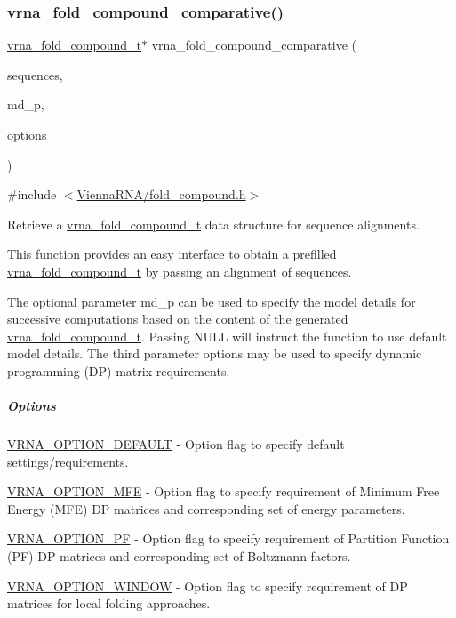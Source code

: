 \subsubsection{\texorpdfstring{vrna\+\_\+fold\+\_\+compound\+\_\+comparative()}{vrna\_fold\_compound\_comparative()}}
{\footnotesize\ttfamily \hyperlink{group__fold__compound_ga1b0cef17fd40466cef5968eaeeff6166}{vrna\+\_\+fold\+\_\+compound\+\_\+t}$\ast$ vrna\+\_\+fold\+\_\+compound\+\_\+comparative (\begin{DoxyParamCaption}\item[{const char $\ast$$\ast$}]{sequences,  }\item[{\hyperlink{group__model__details_ga1f8a10e12a0a1915f2a4eff0b28ea17c}{vrna\+\_\+md\+\_\+t} $\ast$}]{md\+\_\+p,  }\item[{unsigned int}]{options }\end{DoxyParamCaption})}



{\ttfamily \#include $<$\hyperlink{fold__compound_8h}{Vienna\+R\+N\+A/fold\+\_\+compound.\+h}$>$}



Retrieve a \hyperlink{group__fold__compound_ga1b0cef17fd40466cef5968eaeeff6166}{vrna\+\_\+fold\+\_\+compound\+\_\+t} data structure for sequence alignments. 

This function provides an easy interface to obtain a prefilled \hyperlink{group__fold__compound_ga1b0cef17fd40466cef5968eaeeff6166}{vrna\+\_\+fold\+\_\+compound\+\_\+t} by passing an alignment of sequences.

The optional parameter {\ttfamily md\+\_\+p} can be used to specify the model details for successive computations based on the content of the generated \hyperlink{group__fold__compound_ga1b0cef17fd40466cef5968eaeeff6166}{vrna\+\_\+fold\+\_\+compound\+\_\+t}. Passing N\+U\+LL will instruct the function to use default model details. The third parameter {\ttfamily options} may be used to specify dynamic programming (DP) matrix requirements.

\subparagraph*{Options}


\begin{DoxyItemize}
\item \hyperlink{group__fold__compound_gacea5b7ee6181c485f36e2afa0e9089e4}{V\+R\+N\+A\+\_\+\+O\+P\+T\+I\+O\+N\+\_\+\+D\+E\+F\+A\+U\+LT} -\/ Option flag to specify default settings/requirements.
\item \hyperlink{group__fold__compound_gae63be9127fe7dcc1f9bb14f5bb1064ee}{V\+R\+N\+A\+\_\+\+O\+P\+T\+I\+O\+N\+\_\+\+M\+FE} -\/ Option flag to specify requirement of Minimum Free Energy (M\+FE) DP matrices and corresponding set of energy parameters.
\item \hyperlink{group__fold__compound_gabfbadcddda3e74ce7f49035ef8f058f7}{V\+R\+N\+A\+\_\+\+O\+P\+T\+I\+O\+N\+\_\+\+PF} -\/ Option flag to specify requirement of Partition Function (PF) DP matrices and corresponding set of Boltzmann factors.
\item \hyperlink{group__fold__compound_ga2b2a8009ccdccc3eb1571556261aee8e}{V\+R\+N\+A\+\_\+\+O\+P\+T\+I\+O\+N\+\_\+\+W\+I\+N\+D\+OW} -\/ Option flag to specify requirement of DP matrices for local folding approaches.
\end{DoxyItemize}

